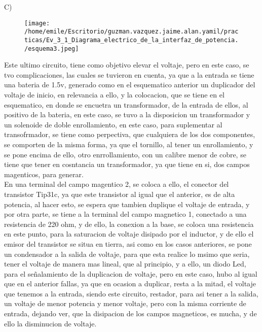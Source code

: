 \documentclass[11pt]{article}
\begin{document}
C)\\

\begin{figure}[htp]
\centering
\texttt{[image: /home/emile/Escritorio/guzman.vazquez.jaime.alan.yamil/practicas/Ev\_3\_1\_Diagrama\_electrico\_de\_la\_interfaz\_de\_potencia./esquema3.jpeg]}
\caption{}
\label{}
\end{figure}

Este ultimo circuito, tiene como objetivo elevar el voltaje, pero en este caso, se tvo complicaciones, las cuales se tuvieron en cuenta, ya que a la entrada se tiene una bateria de 1.5v, generado como en el esquematico anterior un duplicador del voltaje de inicio, en relevancia a ello, y la colocacion, que se tiene en el esquematico, en donde se encuetra un transformador, de la entrada de ellos, al positivo de la bateria, en este caso, se tuvo a la disposicion un transformador y un solenoide de doble enrollamiento, en este caso, para suplementar al transofrmador, se tiene como perpectiva, que cualquiera de los dos componentes, se comporten de la misma forma, ya que el tornillo, al tener un enrollamiento, y se pone encima de ello, otro enrrollamiento, con un calibre menor de cobre, se tiene que tener en cosntancia un transformador, ya que tiene en si, dos campos magenticos, para generar.\\

En una terminal del campo magentico 2, se coloca a ello, el conector del transistor Tip31c, ya que este transistor al igual que el anterior, es de alta potencia, al hacer esto, se espera que tambien duplique el voltaje de entrada, y por otra parte, se tiene a la terminal del campo magnetico 1, conectado a una resistencia de 220 ohm, y de ello, la conexion a la base, se coloca una resistencia en este punto, para la saturacion de voltaje disipado por el inductor, y de ello el emisor del transistor se situa en tierra, asi como en los casos anteriores, se pone un condensador a la salida de voltaje, para que esta realice lo msimo que seria, tener el voltaje de manera mas lineal, que al principio, y a ello, un diodo Led, para el señalamiento de la duplicacion de voltaje, pero en este caso, hubo al igual que en el anterior fallas, ya que en ocasion a duplicar, resta a la mitad, el voltaje que tenemos a la entrada, siendo este circuito, restador, para asi tener a la salida, un voltaje de menor potencia y menor voltaje, pero con la misma corriente de entrada, dejando ver, que la disipacion de los campos magneticos, es mucha, y de ello la disminucion de voltaje.\\
\end{document}
